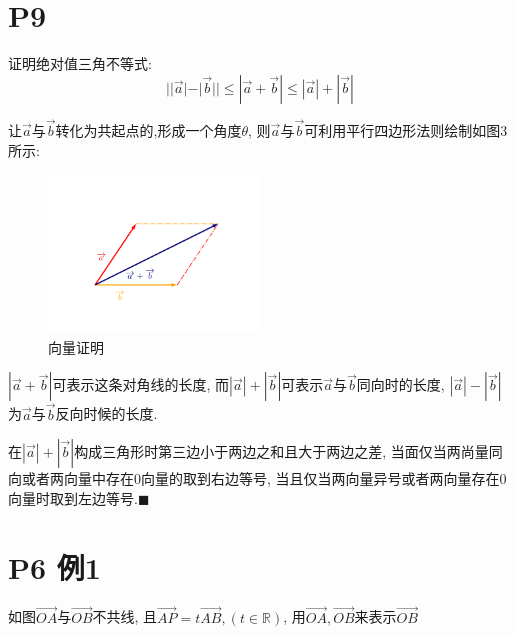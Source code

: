 \documentclass{book}
\begin{document}
    \section{\textcolor[rgb]{0.11,0.65,0.52}{P9}}
    \begin{boxB}
        证明\textcolor[rgb]{0.38,0.11,0.2}{绝对值三角不等式}: $$
            ||\overrightarrow{a}|-|\overrightarrow{b}||\le|\overrightarrow{a}+\overrightarrow{b}|\le|\overrightarrow{a}|+|\overrightarrow{b}|
        $$
    \end{boxB}

    让$\overrightarrow{a}$与$\overrightarrow{b}$转化为共起点的,形成一个角度$\theta$, 则$\overrightarrow{a}$与$\overrightarrow{b}$可利用平行四边形法则绘制如图3所示:
    \begin{figure}[htbp]
        \centering
        \includegraphics[width=0.5\textwidth]{img/vector.png}
        \caption{向量证明}
    \end{figure}

$\displaystyle |\overrightarrow{a}+\overrightarrow{b}|$可表示这条对角线的长度, 而$|\overrightarrow{a}|+|\overrightarrow{b}|$可表示$\overrightarrow{a}$与$\overrightarrow{b}$同向时的长度, $|\overrightarrow{a}|-|\overrightarrow{b}|$为$\overrightarrow{a}$与$\overrightarrow{b}$反向时候的长度.

    在$|\overrightarrow{a}|+|\overrightarrow{b}|$构成三角形时\textcolor[rgb]{0.75,0.17,0.22}{第三边小于两边之和且大于两边之差}, 当面仅当两尚量同向或者两向量中存在0向量的取到右边等号, 当且仅当两向量异号或者两向量存在0向量时取到左边等号.$\blacksquare$

    \section{\textcolor[rgb]{0.11,0.65,0.52}{P6 例1}}

    如图$\overrightarrow{OA}$与$\overrightarrow{OB}$不共线, 且$\overrightarrow{AP}=t\overrightarrow{AB}, (t\in \mathbb{R})$, 用$\overrightarrow{OA},\overrightarrow{OB}$来表示$\overrightarrow{OB}$
\end{document}
